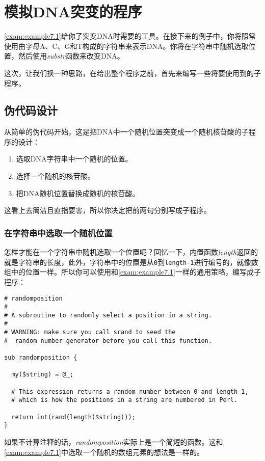 \section{模拟DNA突变的程序}
\autoref{exam:example7.1}给你了突变DNA时需要的工具。在接下来的例子中，你将照常使用由字母A、C、G和T构成的字符串来表示DNA。你将在字符串中随机选取位置，然后使用\textit{substr}函数来改变DNA。

这次，让我们换一种思路，在给出整个程序之前，首先来编写一些将要使用到的子程序。

\subsection{伪代码设计}
从简单的伪代码开始，这是把DNA中一个随机位置突变成一个随机核苷酸的子程序的设计：

\begin{enumerate}
  \item 选取DNA字符串中一个随机的位置。
  \item 选择一个随机的核苷酸。
  \item 把DNA随机位置替换成随机的核苷酸。
\end{enumerate}

这看上去简洁且直指要害，所以你决定把前两句分别写成子程序。
\subsubsection{在字符串中选取一个随机位置}
怎样才能在一个字符串中随机选取一个位置呢？回忆一下，内置函数\textit{length}返回的就是字符串的长度，此外，字符串中的位置是从\verb|0|到\verb|length-1|进行编号的，就像数组中的位置一样。所以你可以使用和\autoref{exam:example7.1}一样的通用策略，编写成子程序：

\begin{lstlisting}
# randomposition
#
# A subroutine to randomly select a position in a string.
#
# WARNING: make sure you call srand to seed the
#  random number generator before you call this function.

sub randomposition {

  my($string) = @_;

  # This expression returns a random number between 0 and length-1,
  # which is how the positions in a string are numbered in Perl.

  return int(rand(length($string)));
}
\end{lstlisting}

如果不计算注释的话，\textit{randomposition}实际上是一个简短的函数。这和\autoref{exam:example7.1}中选取一个随机的数组元素的想法是一样的。

